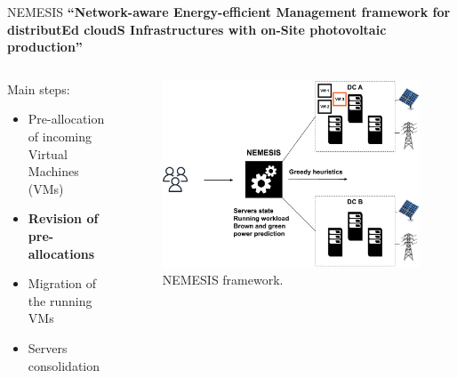 \documentclass[Ligatures=TeX,table,svgnames,usetotalslideindicator,compress,10pt,aspectratio=169]{beamer}
\begin{document}
\begin{frame}{NEMESIS}
  \textbf {``\alert{N}etwork-aware \alert{E}nergy-efficient
    \alert{M}anagement framework for distribut\alert{E}d
    cloud\alert{S} \alert{I}nfrastructures with on-\alert{S}ite
    photovoltaic production''}  
  \begin{columns}        
    \begin{column}{0.4\textwidth}
Main steps:
\small
\begin{itemize}
    \item Pre-allocation of incoming Virtual Machines (VMs)
    \item \alert{\textbf{Revision of pre-allocations}}
    \item Migration of the running VMs
    \item Servers consolidation
\end{itemize}
\end{column}   

\begin{column}{0.6\textwidth}
      \begin{figure}[!h]
        \centering
        \includegraphics[width=.85\textwidth]{images/nemesis_review_2.pdf}
        \caption{NEMESIS framework.}
      \end{figure}
    \end{column}        

\end{columns}
\end{frame}
\end{document}

